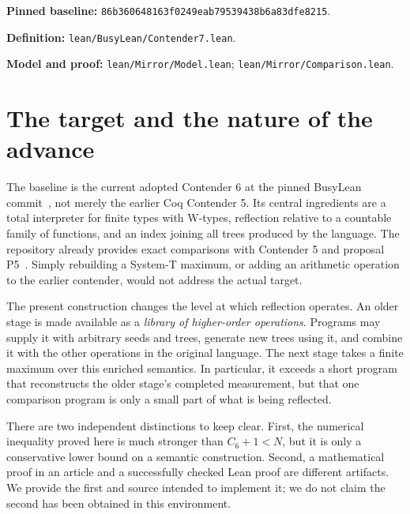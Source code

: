 \documentclass[11pt,letterpaper]{article}
\theoremstyle{definition}
\newcommand{\code}[1]{\nolinkurl{#1}}
\newcommand{\sourcecommit}{\texttt{86b360648163f0249eab79539438b6a83dfe8215}}
\begin{document}
\begin{center}
\end{center}
\vfill
\noindent\small\textbf{Pinned baseline:} \sourcecommit.\par
\noindent\small\textbf{Definition:} \code{lean/BusyLean/Contender7.lean}.\par
\noindent\small\textbf{Model and proof:} \code{lean/Mirror/Model.lean};
\code{lean/Mirror/Comparison.lean}.

\clearpage
\normalsize
\setcounter{tocdepth}{1}
\tableofcontents
\clearpage

\section{The target and the nature of the advance}
\label{sec:target}

The baseline is the current adopted Contender 6 at the pinned BusyLean
commit~\cite{repo,c6}, not merely the earlier Coq Contender 5. Its central
ingredients are a total interpreter for finite types with W-types, reflection
relative to a countable family of functions, and an index joining all trees
produced by the language. The repository already provides exact comparisons
with Contender 5 and proposal P5~\cite{comparison}. Simply rebuilding a System-T
maximum, or adding an arithmetic operation to the earlier contender, would not
address the actual target.

The present construction changes the level at which reflection operates. An
older stage is made available as a \emph{library of higher-order operations}.
Programs may supply it with arbitrary seeds and trees, generate new trees using
it, and combine it with the other operations in the original language. The
next stage takes a finite maximum over this enriched semantics. In particular,
it exceeds a short program that reconstructs the older stage's completed
measurement, but that one comparison program is only a small part of what is
being reflected.

There are two independent distinctions to keep clear. First, the numerical
inequality proved here is much stronger than $C_6+1<N$, but it is only a
conservative lower bound on a semantic construction. Second, a mathematical
proof in an article and a successfully checked Lean proof are different
artifacts. We provide the first and source intended to implement it; we do not
claim the second has been obtained in this environment.
\end{document}
